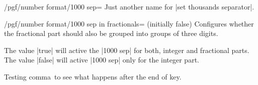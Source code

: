 \begin{stylekey}{/pgf/number format/1000 sep=}
    Just another name for |set thousands separator|.
\end{stylekey}

\begin{key}{/pgf/number format/1000 sep in fractionals= (initially false)}
    Configures whether the fractional part should also be grouped into groups
    of three digits.

    The value |true| will active the |1000 sep| for both, integer and
    fractional parts. The value |false| will active |1000 sep| only for the
    integer part.
\begin{codeexample}[pre={\begin{lateximage}},post={\end{lateximage}}]
\end{codeexample}
\begin{codeexample}[pre={\begin{lateximage}},post={\end{lateximage}}]
\end{codeexample}
\end{key}

Testing comma\, to see what happens after the end of key.

